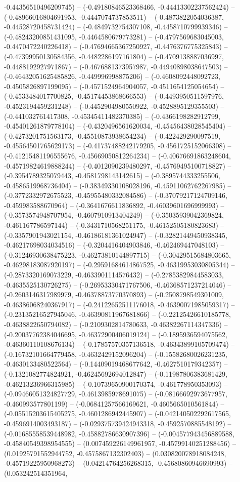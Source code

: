 -0.44356510496209745) -- (-0.49180846523368466, -0.44413302237562424) -- (-0.48966016804691953, -0.4447074737853511) -- (-0.4873822054036387, -0.44528720458731424) -- (-0.4849732754307108, -0.4458710799939346) -- (-0.48243200851431095, -0.4464580679773281) -- (-0.4797569683045003, -0.4470472240226418) -- (-0.47694665367250927, -0.4476376775325843) -- (-0.47399950130584356, -0.4482286197161804) -- (-0.4709138887036997, -0.4488192927971867) -- (-0.4676881373957987, -0.44940898038647503) -- (-0.46432051625485826, -0.449996998875206) -- (-0.4608092448092723, -0.4505826897199095) -- (-0.4571524964904057, -0.4511654125054654) -- (-0.4533484017700825, -0.45174453868666553) -- (-0.4493950511597976, -0.4523194459231248) -- (-0.4452904980550922, -0.4528895129355503) -- (-0.441032761417308, -0.45345411482370385) -- (-0.4366198282912799, -0.45401261879778104) -- (-0.4320496561620034, -0.45456438028545404) -- (-0.4273201751563173, -0.45510873938654234) -- (-0.422429290097519, -0.45564501765629173) -- (-0.41737488242179205, -0.4561725152066308) -- (-0.41215481196555676, -0.45669050812264234) -- (-0.40676691863248604, -0.45719824619888244) -- (-0.4012090239480297, -0.45769495100718827) -- (-0.3954789325079443, -0.4581798143142615) -- (-0.3895744333255506, -0.4586519968736404) -- (-0.38349330108028196, -0.45911062762267985) -- (-0.3772332972675523, -0.45955480332084586) -- (-0.37079217124709146, -0.459983588670964) -- (-0.3641676611836892, -0.46039601696999993) -- (-0.3573574948707954, -0.4607910913404249) -- (-0.35035939042369824, -0.461167786597144) -- (-0.3431710568251175, -0.46152505180823683) -- (-0.3357901943021154, -0.46186181361024947) -- (-0.32821449450938345, -0.46217698034034516) -- (-0.3204416404903846, -0.462469447048103) -- (-0.31246930638475223, -0.46273810144897715) -- (-0.30429515684803665, -0.46298183087920197) -- (-0.29591684614867525, -0.46319953030805344) -- (-0.2873320169073229, -0.4633901114576432) -- (-0.27853829844583033, -0.4635525130726275) -- (-0.26953330471767506, -0.46368571237214046) -- (-0.2603146317989979, -0.46378873770370893) -- (-0.2508798549301009, -0.46386068240367917) -- (-0.24122652511176018, -0.46390071985059317) -- (-0.23135216527945046, -0.46390811967681866) -- (-0.22125426610185778, -0.4638822650794082) -- (-0.2109302814780633, -0.46382267114347336) -- (-0.20037762384046695, -0.46372900406019124) -- (-0.1895936594075562, -0.46360110108676134) -- (-0.17857570357136518, -0.46343899105709474) -- (-0.16732101664779458, -0.4632429152096204) -- (-0.15582680026231235, -0.4630133480522564) -- (-0.14409019468677642, -0.4627510179342357) -- (-0.1321082774824921, -0.46245692694012847) -- (-0.11987806383681429, -0.46213236966315985) -- (-0.10739650900170374, -0.461778950353093) -- (-0.09466051324827729, -0.4613985978691075) -- (-0.08166692973677957, -0.460993577801199) -- (-0.06841257566169621, -0.4605665010561844) -- (-0.05515203615405275, -0.4601286942445907) -- (-0.042140502292617565, -0.4596914003493187) -- (-0.029375739424943318, -0.4592570885548192) -- (-0.01685558539448982, -0.45882786630907396) -- (-0.004577943456889588, -0.45840549398954555) -- (0.007459226149961957, -0.45799140251288456) -- (0.01925791552944752, -0.4575867132302403) -- (0.030820078918084248, -0.45719225950968273) -- (0.04214764256268315, -0.45680860946690993) -- (0.053242514351964, 